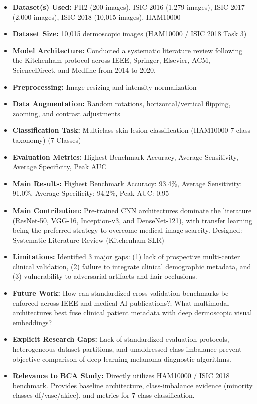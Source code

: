 \documentclass[11pt,a4paper]{article}
\begin{document}
\begin{itemize}\small
\item \textbf{Dataset(s) Used:} PH2 (200 images), ISIC 2016 (1,279 images), ISIC 2017 (2,000 images), ISIC 2018 (10,015 images), HAM10000
\item \textbf{Dataset Size:} 10,015 dermoscopic images (HAM10000 / ISIC 2018 Task 3)
\item \textbf{Model Architecture:} Conducted a systematic literature review following the Kitchenham protocol across IEEE, Springer, Elsevier, ACM, ScienceDirect, and Medline from 2014 to 2020.
\item \textbf{Preprocessing:} Image resizing and intensity normalization
\item \textbf{Data Augmentation:} Random rotations, horizontal/vertical flipping, zooming, and contrast adjustments
\item \textbf{Classification Task:} Multiclass skin lesion classification (HAM10000 7-class taxonomy) (7 Classes)
\item \textbf{Evaluation Metrics:} Highest Benchmark Accuracy, Average Sensitivity, Average Specificity, Peak AUC
\item \textbf{Main Results:} Highest Benchmark Accuracy: 93.4\%, Average Sensitivity: 91.0\%, Average Specificity: 94.2\%, Peak AUC: 0.95
\item \textbf{Main Contribution:} Pre-trained CNN architectures dominate the literature (ResNet-50, VGG-16, Inception-v3, and DenseNet-121), with transfer learning being the preferred strategy to overcome medical image scarcity. Designed: Systematic Literature Review (Kitchenham SLR)
\item \textbf{Limitations:} Identified 3 major gaps: (1) lack of prospective multi-center clinical validation, (2) failure to integrate clinical demographic metadata, and (3) vulnerability to adversarial artifacts and hair occlusions.
\item \textbf{Future Work:} How can standardized cross-validation benchmarks be enforced across IEEE and medical AI publications?; What multimodal architectures best fuse clinical patient metadata with deep dermoscopic visual embeddings?
\item \textbf{Explicit Research Gaps:} Lack of standardized evaluation protocols, heterogeneous dataset partitions, and unaddressed class imbalance prevent objective comparison of deep learning melanoma diagnostic algorithms.
\item \textbf{Relevance to BCA Study:} Directly utilizes HAM10000 / ISIC 2018 benchmark. Provides baseline architecture, class-imbalance evidence (minority classes df/vasc/akiec), and metrics for 7-class classification.
\end{itemize}
\end{document}
